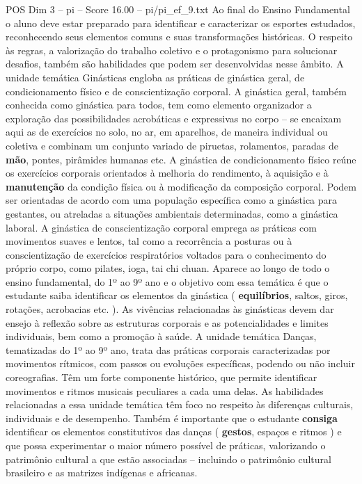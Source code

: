\begin{textsample}{POS Dim 3 – pi – Score 16.00 – pi/pi\_ef\_9.txt}
Ao final do Ensino Fundamental o aluno deve estar preparado para identificar e caracterizar os esportes estudados, reconhecendo seus elementos comuns e suas transformações históricas.
O respeito às regras, a valorização do trabalho coletivo e o protagonismo para solucionar desafios, também são habilidades que podem ser desenvolvidas nesse âmbito.
A unidade temática Ginásticas engloba as práticas de ginástica geral, de condicionamento físico e de conscientização corporal.
A ginástica geral, também conhecida como ginástica para todos, tem como elemento organizador a exploração das possibilidades acrobáticas e expressivas no corpo – se encaixam aqui as de exercícios no solo, no ar, em aparelhos, de maneira individual ou coletiva e combinam um conjunto variado de piruetas, rolamentos, paradas de \textbf{mão}, pontes, pirâmides humanas etc.
A ginástica de condicionamento físico reúne os exercícios corporais orientados à melhoria do rendimento, à aquisição e à \textbf{manutenção} da condição física ou à modificação da composição corporal.
Podem ser orientadas de acordo com uma população específica como a ginástica para gestantes, ou atreladas a situações ambientais determinadas, como a ginástica laboral.
A ginástica de conscientização corporal emprega as práticas com movimentos suaves e lentos, tal como a recorrência a posturas ou à conscientização de exercícios respiratórios voltados para o conhecimento do próprio corpo, como pilates, ioga, tai chi chuan.
Aparece ao longo de todo o ensino fundamental, do 1º ao 9º ano e o objetivo com essa temática é que o estudante saiba identificar os elementos da ginástica ( \textbf{equilíbrios}, saltos, giros, rotações, acrobacias etc. ).
As vivências relacionadas às ginásticas devem dar ensejo à reflexão sobre as estruturas corporais e as potencialidades e limites individuais, bem como a promoção à saúde.
A unidade temática Danças, tematizadas do 1º ao 9º ano, trata das práticas corporais caracterizadas por movimentos rítmicos, com passos ou evoluções específicas, podendo ou não incluir coreografias.
Têm um forte componente histórico, que permite identificar movimentos e ritmos musicais peculiares a cada uma delas.
As habilidades relacionadas a essa unidade temática têm foco no respeito às diferenças culturais, individuais e de desempenho.
Também é importante que o estudante \textbf{consiga} identificar os elementos constitutivos das danças ( \textbf{gestos}, espaços e ritmos ) e que possa experimentar o maior número possível de práticas, valorizando o patrimônio cultural a que estão associadas – incluindo o patrimônio cultural brasileiro e as matrizes indígenas e africanas.

\end{textsample}
